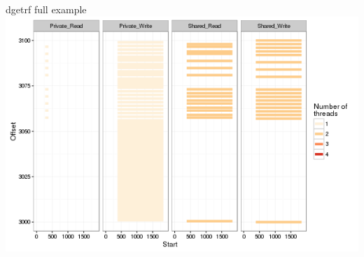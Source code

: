 \documentclass[xcolor={usenames,dvipsnames},hyperref={pdfusetitle}]{beamer}
\begin{document}
\begin{frame}{dgetrf full example}
{{{            }{
                \includegraphics[width=\textwidth]{labbook/intensity_Share_dgetrf_zoom-init1}
            }
        }
    }
    \pause
    \pause
    \pause
\end{frame}%
\end{document}
